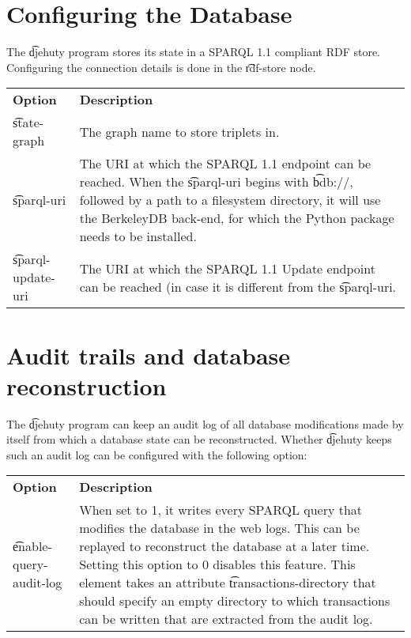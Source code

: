 \section{Configuring the Database}

  The \t{djehuty} program stores its state in a SPARQL 1.1 compliant
  RDF store.  Configuring the connection details is done in the
  \t{rdf-store} node.

\begin{tabularx}{\textwidth}{*{1}{!{\VRule[-1pt]}l}!{\VRule[-1pt]}X}
  \headrow
  \textbf{Option}            & \textbf{Description}\\
  \t{state-graph}            & The graph name to store triplets in.\\
  \t{sparql-uri}             & The URI at which the SPARQL 1.1 endpoint can
                               be reached.\newline\newline
                               When the \t{sparql-uri} begins with \t{bdb://},
                               followed by a path to a filesystem directory,
                               it will use the BerkeleyDB back-end, for which
                               the  Python package needs to
                               be installed.\\
  \t{sparql-update-uri}      & The URI at which the SPARQL 1.1 Update endpoint
                               can be reached (in case it is different from
                               the \t{sparql-uri}.
\end{tabularx}

\section{Audit trails and database reconstruction}

  The \t{djehuty} program can keep an audit log of all database modifications
  made by itself from which a database state can be reconstructed.  Whether
  \t{djehuty} keeps such an audit log can be configured with the following
  option:

\begin{tabularx}{\textwidth}{*{1}{!{\VRule[-1pt]}l}!{\VRule[-1pt]}X}
  \headrow
  \textbf{Option}            & \textbf{Description}\\
  \t{enable-query-audit-log} & When set to 1, it writes every SPARQL query that
                               modifies the database in the web logs.  This can
                               be replayed to reconstruct the database at a
                               later time.  Setting this option to 0 disables
                               this feature.  This element takes an attribute
                               \t{transactions-directory} that should specify
                               an empty directory to which transactions can be
                               written that are extracted from the audit log.
\end{tabularx}


